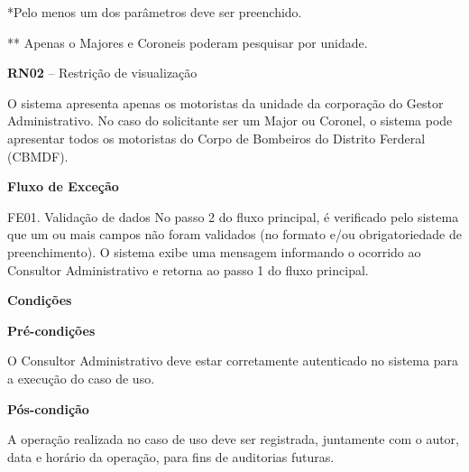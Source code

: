     
     \begin{center} 
      *Pelo menos um dos parâmetros deve ser preenchido.
      
    
      ** Apenas o Majores e Coroneis poderam pesquisar por unidade.
    \end{center}
      
    \vfill
    \pagebreak
    
    \textbf{RN02} –  Restrição de visualização
    
      O sistema apresenta apenas os motoristas da unidade da corporação do Gestor Administrativo. No caso do solicitante ser um
      Major ou Coronel, o sistema pode apresentar todos os motoristas do Corpo de Bombeiros do Distrito Ferderal (CBMDF).
    
   {\raggedright
      \textbf{Fluxo de Exceção}
   }
	
    FE01. Validação de dados
	No passo 2 do fluxo principal, é verificado pelo sistema que um ou mais campos não foram validados (no formato e/ou 
	obrigatoriedade de preenchimento). O sistema exibe uma mensagem informando o ocorrido ao Consultor Administrativo e
	retorna ao passo 1 do fluxo principal.


	
   {\raggedright
      \textbf{Condições}
   }
   
    
   \textbf{Pré-condições}
   
   O Consultor Administrativo deve estar corretamente autenticado no sistema para a execução do caso de uso.
   
   \textbf{Pós-condição}
   
   A operação realizada no caso de uso deve ser registrada, juntamente com o autor, data e horário da operação, para fins de auditorias futuras.
   
   \vfill
   \pagebreak